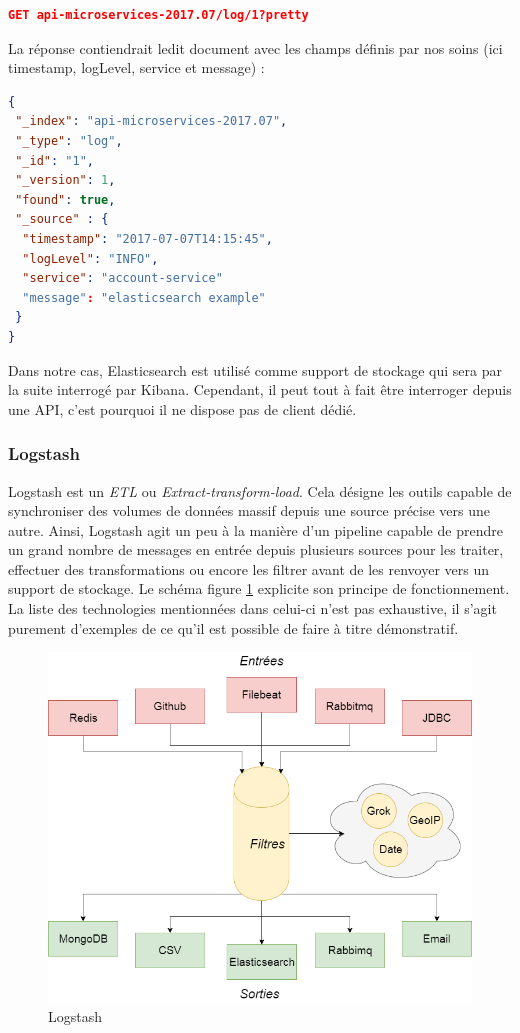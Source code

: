 \begin{lstlisting}[language=json]
 GET api-microservices-2017.07/log/1?pretty
 \end{lstlisting}
	
	La réponse contiendrait ledit document avec les champs définis par nos soins (ici timestamp, logLevel, service et message) :
	
\begin{lstlisting}[language=json]
{
 "_index": "api-microservices-2017.07",
 "_type": "log",
 "_id": "1",
 "_version": 1,
 "found": true,
 "_source" : {
  "timestamp": "2017-07-07T14:15:45",
  "logLevel": "INFO",
  "service": "account-service"
  "message": "elasticsearch example"
 }
}
	\end{lstlisting}
	 
	 Dans notre cas, Elasticsearch est utilisé comme support de stockage qui sera par la suite interrogé par Kibana. Cependant, il peut tout à fait être interroger depuis une API, c'est pourquoi il ne dispose pas de client dédié.
	
	\subsubsection{Logstash}
	Logstash est un \textit{ETL} ou \textit{Extract-transform-load}. Cela désigne les outils capable de synchroniser des volumes de données massif depuis une source précise vers une autre. Ainsi, Logstash agit un peu à la manière d'un pipeline capable de prendre un grand nombre de messages en entrée depuis plusieurs sources pour les traiter, effectuer des transformations ou encore les filtrer avant de les renvoyer vers un support de stockage. Le schéma figure \ref{logstash} explicite son principe de fonctionnement. La liste des technologies mentionnées dans celui-ci n'est pas exhaustive, il s'agit purement d'exemples de ce qu'il est possible de faire à titre démonstratif. \\
	
	\begin{figure}[h!]
		\includegraphics[scale=0.4]{images/travailNeuflizeOBC/dashboard/logstash.png}
		\centering
		\caption{Logstash}
		\label{logstash}
	\end{figure}
	
